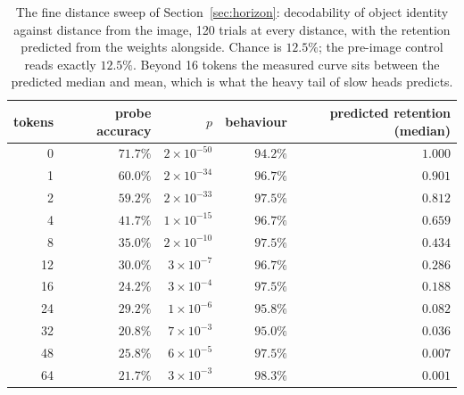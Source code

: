 \documentclass{article}
\begin{document}
\begin{table}[h]
\centering\small
\begin{tabular}{rrrrr}
\toprule
tokens & probe accuracy & $p$ & behaviour & predicted retention (median) \\
\midrule
0  & $71.7\%$ & $2\times10^{-50}$ & $94.2\%$ & $1.000$ \\
1  & $60.0\%$ & $2\times10^{-34}$ & $96.7\%$ & $0.901$ \\
2  & $59.2\%$ & $2\times10^{-33}$ & $97.5\%$ & $0.812$ \\
4  & $41.7\%$ & $1\times10^{-15}$ & $96.7\%$ & $0.659$ \\
8  & $35.0\%$ & $2\times10^{-10}$ & $97.5\%$ & $0.434$ \\
12 & $30.0\%$ & $3\times10^{-7}$  & $96.7\%$ & $0.286$ \\
16 & $24.2\%$ & $3\times10^{-4}$  & $97.5\%$ & $0.188$ \\
24 & $29.2\%$ & $1\times10^{-6}$  & $95.8\%$ & $0.082$ \\
32 & $20.8\%$ & $7\times10^{-3}$  & $95.0\%$ & $0.036$ \\
48 & $25.8\%$ & $6\times10^{-5}$  & $97.5\%$ & $0.007$ \\
64 & $21.7\%$ & $3\times10^{-3}$  & $98.3\%$ & $0.001$ \\
\bottomrule
\end{tabular}
\caption{The fine distance sweep of Section~\ref{sec:horizon}: decodability of
object identity against distance from the image, 120 trials at every distance,
with the retention predicted from the weights alongside. Chance is $12.5\%$; the
pre-image control reads exactly $12.5\%$. Beyond 16 tokens the measured curve
sits between the predicted median and mean, which is what the heavy tail of slow
heads predicts.}
\label{tab:fine}
\end{table}
\end{document}
